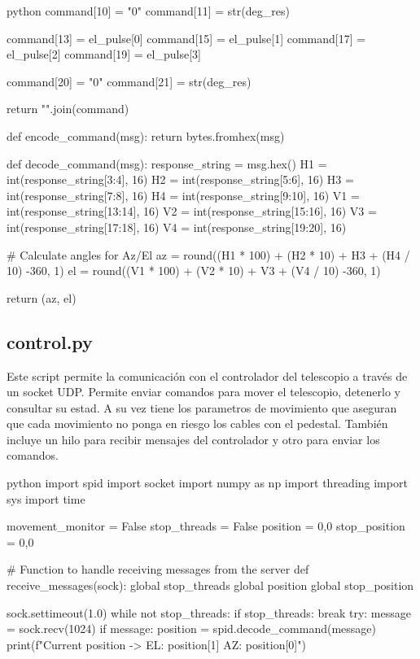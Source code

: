 \begin{appendixs}
\begin{sourcecode}[]{python}{}
        command[10] = "0"
        command[11] = str(deg_res)
    
        command[13] = el_pulse[0]
        command[15] = el_pulse[1]
        command[17] = el_pulse[2]
        command[19] = el_pulse[3]
    
        command[20] = "0"
        command[21] = str(deg_res)
        
        return "".join(command)
    
    def encode_command(msg):
        return bytes.fromhex(msg)
    
    def decode_command(msg):
        response_string = msg.hex()
        H1 = int(response_string[3:4], 16)
        H2 = int(response_string[5:6], 16)
        H3 = int(response_string[7:8], 16)
        H4 = int(response_string[9:10], 16)
        V1 = int(response_string[13:14], 16)
        V2 = int(response_string[15:16], 16)
        V3 = int(response_string[17:18], 16)
        V4 = int(response_string[19:20], 16)
    
        # Calculate angles for Az/El
        az = round((H1 * 100) + (H2 * 10) + H3 + (H4 / 10) -360, 1)
        el = round((V1 * 100) + (V2 * 10) + V3 + (V4 / 10) -360, 1)
    
        return (az, el)    
\end{sourcecode}

\subsection{control.py}

Este script permite la comunicación con el controlador del telescopio a través de un socket UDP. Permite enviar comandos para mover el telescopio, detenerlo y consultar su estad. A su vez tiene los parametros de movimiento que aseguran que cada movimiento no ponga en riesgo los cables con el pedestal. También incluye un hilo para recibir mensajes del controlador y otro para enviar los comandos.

\begin{sourcecode}[]{python}{}
import spid
import socket
import numpy as np
import threading
import sys
import time

movement_monitor = False
stop_threads = False
position = 0,0
stop_position = 0,0

# Function to handle receiving messages from the server
def receive_messages(sock):
    global stop_threads
    global position
    global stop_position

    sock.settimeout(1.0)
    while not stop_threads:
        if stop_threads:
            break
        try:
            message = sock.recv(1024)
            if message:
                position = spid.decode_command(message)
                print(f"Current position -> EL: {position[1]} AZ: {position[0]}")


\end{sourcecode}
\end{appendixs}
